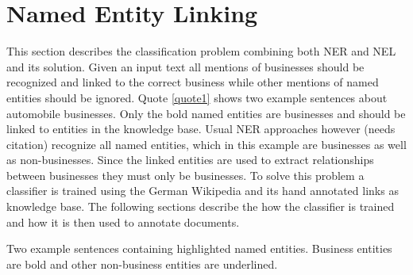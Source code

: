 \section{Named Entity Linking}
\label{sec:NEL}
This section describes the classification problem combining both NER and NEL and its solution. Given an input text all mentions of businesses should be recognized and linked to the correct business while other mentions of named entities should be ignored. Quote \ref{quote1} shows two example sentences about automobile businesses. Only the bold named entities are businesses and should be linked to entities in the knowledge base. Usual NER approaches however (needs citation) recognize all named entities, which in this example are businesses as well as non-businesses. Since the linked entities are used to extract relationships between businesses they must only be businesses. To solve this problem a classifier is trained using the German Wikipedia and its hand annotated links as knowledge base. The following sections describe the how the classifier is trained and how it is then used to annotate documents.\\
\begin{nscenter}
	\begin{quotecaption}
	Two example sentences containing highlighted named entities. Business entities are bold and other non-business entities are underlined.
	\label{quote1}
	\end{quotecaption}
\end{nscenter}

